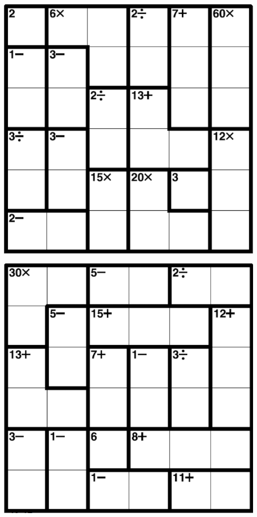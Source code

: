 
\includegraphics[scale=1]{Gambar/Lampiran/6x6_17.png}

\includegraphics[scale=1]{Gambar/Lampiran/6x6_18.png}
